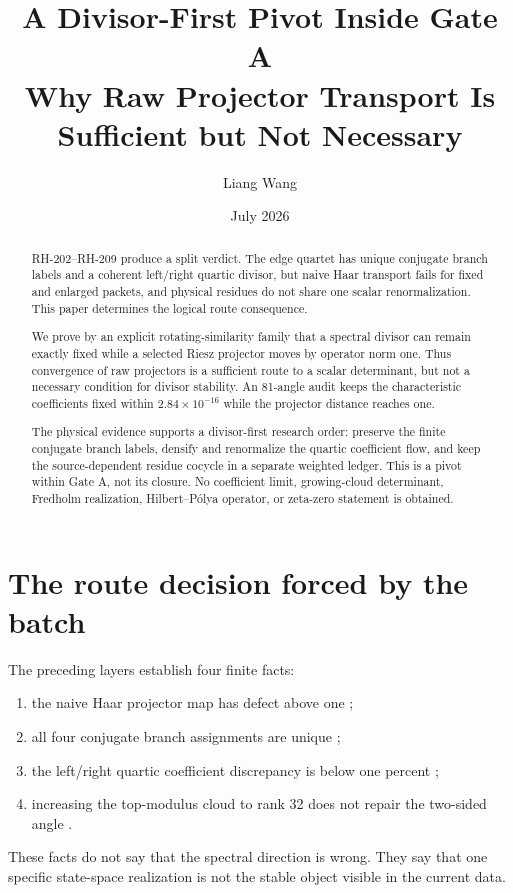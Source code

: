 \documentclass[12pt]{article}
\title{A Divisor-First Pivot Inside Gate A\\
\large Why Raw Projector Transport Is Sufficient but Not Necessary}
\author{Liang Wang}\date{July 2026}
\theoremstyle{remark}\newtheorem{remark}[theorem]{Remark}
\begin{document}
\maketitle
\begin{abstract}
RH-202--RH-209 produce a split verdict.  The edge quartet has unique
conjugate branch labels and a coherent left/right quartic divisor, but naive
Haar transport fails for fixed and enlarged packets, and physical residues
do not share one scalar renormalization.  This paper determines the logical
route consequence.

We prove by an explicit rotating-similarity family that a spectral divisor
can remain exactly fixed while a selected Riesz projector moves by operator
norm one.  Thus convergence of raw projectors is a sufficient route to a
scalar determinant, but not a necessary condition for divisor stability.
An 81-angle audit keeps the characteristic coefficients fixed within
$2.84\times10^{-16}$ while the projector distance reaches one.

The physical evidence supports a divisor-first research order: preserve the
finite conjugate branch labels, densify and renormalize the quartic
coefficient flow, and keep the source-dependent residue cocycle in a
separate weighted ledger.  This is a pivot within Gate A, not its closure.
No coefficient limit, growing-cloud determinant, Fredholm realization,
Hilbert--P\'olya operator, or zeta-zero statement is obtained.
\end{abstract}

\section{The route decision forced by the batch}

The preceding layers establish four finite facts:
\begin{enumerate}[leftmargin=2em]
\item the naive Haar projector map has defect above one
\citep{WangRH202};
\item all four conjugate branch assignments are unique
\citep{WangRH204};
\item the left/right quartic coefficient discrepancy is below one percent
\citep{WangRH207};
\item increasing the top-modulus cloud to rank 32 does not repair the
two-sided angle \citep{WangRH209}.
\end{enumerate}

These facts do not say that the spectral direction is wrong.  They say that
one specific state-space realization is not the stable object visible in the
current data.
\end{document}
